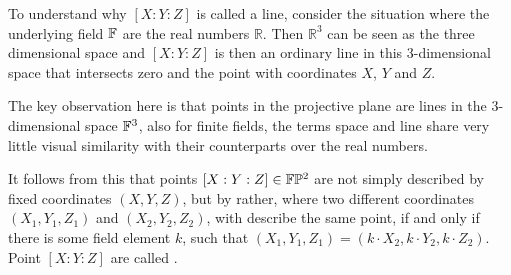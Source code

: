To understand why $[X:Y:Z]$ is called a line, consider the situation where the underlying field $\mathbb{F}$ are the real numbers $\mathbb{R}$. Then $\mathbb{R}^3$ can be seen as the three dimensional space and $[X:Y:Z]$ is then an ordinary line in this 3-dimensional space that intersects zero and the point with coordinates $X$, $Y$ and $Z$.

The key observation here is that points in the projective plane are lines in the $3$-dimensional space $\mathbb{F}^3$, also for finite fields, the terms space and line share very little visual similarity with their counterparts over the real numbers.

It follows from this that points $[X:Y:Z]\in \mathbb{F}\mathbb{P}^2$ are not simply described by fixed coordinates $(X,Y,Z)$, but by  rather, where two different coordinates $(X_1,Y_1,Z_1)$ and $(X_2,Y_2,Z_2)$, with describe the same point, if and only if there is some field element $k$, such that $(X_1,Y_1,Z_1) = (k\cdot X_2,k\cdot Y_2,k\cdot Z_2)$. Point $[X:Y:Z]$ are called .

